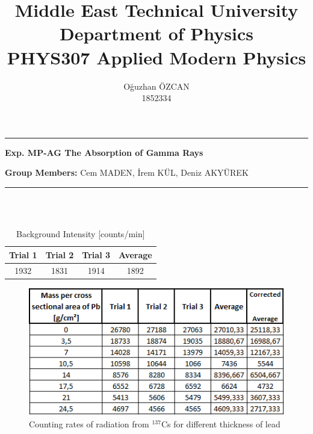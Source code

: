 \documentclass[a4paper,12pt]{article}
\title{Middle East Technical University\\Department of Physics\\\textbf{PHYS307 Applied Modern Physics}}
\author{Oğuzhan ÖZCAN\\1852334}
\date{}
\providecommand{\groupmember}[1]{\textbf{Group Members:} }
\providecommand{\expname}[1]{\textbf{Exp. MP-AG The Absorption of Gamma Rays} }
\begin{document}
\maketitle

\thispagestyle{fancy}

\noindent\rule{18.4cm}{0.8pt}
\begin{center}
	\expname{arg1}{}
\end{center}
\groupmember{arg1}{Cem MADEN, İrem KÜL, Deniz AKYÜREK}\\

\noindent\rule{18.4cm}{0.8pt}\\\\
\begin{table}[h!]
\begin{center}
	\begin{tabular}{|c|c|c|c|}
	\hline Trial 1 & Trial 2 & Trial 3  & Average \\ 
	\hline 1932 & 1831 & 1914 & 1892 \\ 
	\hline 
\end{tabular}
\end{center}
\caption{Background Intensity [counts/min]} 
\end{table}
\begin{figure}[h!]
\centering
\includegraphics[scale = 1.0]{Capture}
\caption{Counting rates of radiation from $^{137}$Cs for different thickness of lead}
\label{fig:Capture}
\end{figure}
\end{document}
